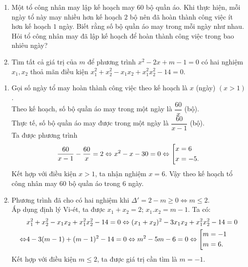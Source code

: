 \begin{ex}%
 \hfill
    \begin{enumerate}
        \item Một tổ công nhân may lập kế hoạch may $60$ bộ quần áo. Khi thực hiện, mỗi ngày tổ này may nhiều hơn kế hoạch $2$ bộ nên đã hoàn thành công việc ít hơn kế hoạch $1$ ngày. Biết rằng số bộ quần áo may trong mỗi ngày như nhau. Hỏi tổ công nhân may đã lập kế hoạch để hoàn thành công việc trong bao nhiêu ngày?
        \item Tìm tất cả giá trị của $m$ để phương trình $x^2-2x+m-1=0$ có hai nghiệm $x_1, x_2$ thoả mãn điều kiện $x_{1}^{2}+ x_{2}^{2}-x_{1}x_{2}+x_{1}^{2}x_{2}^{2}-14=0$.
    \end{enumerate}
\loigiai
    {
    \begin{enumerate}
        \item Gọi số ngày tổ may hoàn thành công việc theo kế hoạch là $x$ (ngày) $\left(x>1 \right)$.\\
        Theo kế hoạch, số bộ quần áo may trong một ngày là $\dfrac{60}{x}$ (bộ).\\
        Thực tế, số bộ quần áo may được trong một ngày là $\dfrac{60}{x-1}$ (bộ).\\
        Ta được phương trình 
        $$\frac{60}{x-1}-\frac{60}{x}=2
        \Leftrightarrow x^2-x-30=0\Leftrightarrow \left[\begin{aligned}& x=6 \\ 
        & x=-5.\end{aligned}\right.$$
        Kết hợp với điều kiện $x>1$, ta nhận nghiệm $x = 6$. Vậy theo kế hoạch tổ công nhân may $60$ bộ quần áo trong $6$ ngày.
        
        \item Phương trình đã cho có hai nghiệm khi $\Delta '=2-m\ge 0\Leftrightarrow m\le 2$.\\
        Áp dụng định lý Vi-ét, ta được $x_{1}+x_{2}=2;\,x_{1}.x_{2}=m-1$.
        Ta có: 
       {\allowdisplaybreaks
       	\begin{align*}
       	&x_{1}^{2}+x_{2}^{2}- x_{1}x_{2}+x_{1}^{2}x_{2}^{2}-14=0 \Leftrightarrow (x_1+x_2)^2-3x_1x_2+x_1^2x_2^2-14=0\\
       	\Leftrightarrow&4-3(m-1)+(m-1)^2-14=0\Leftrightarrow m^{2}-5m-6=0
        \Leftrightarrow \left[\begin{aligned}& m=-1 \\  & m=6.\end{aligned}\right.
        \end{align*}}Kết hợp với điều kiện $m\le2$, ta được giá trị cần tìm là $m=-1$.
    \end{enumerate}
    }
\end{ex}

